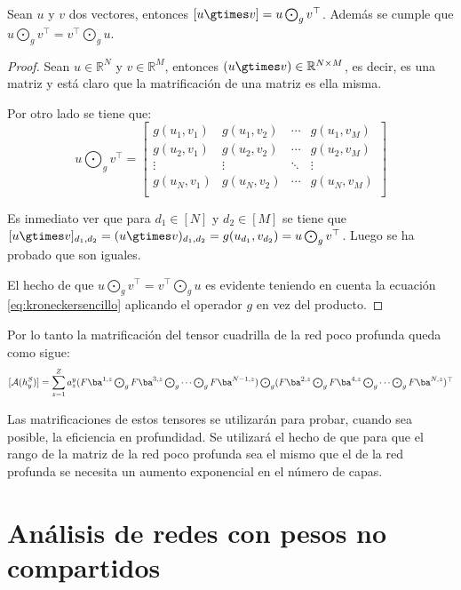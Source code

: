 \begin{prop}
Sean $u$ y $v$ dos vectores, entonces $[u\gtimes v]=u\bigodot_g v^\top$. Además se cumple que $u\bigodot_g v^\top = v^\top\bigodot_g u $.
\end{prop}
\begin{proof}

Sean $u\in\mathbb{R}^N$ y $v\in\mathbb{R}^M$, entonces $(u\gtimes v)\in\mathbb{R}^{N\times M}$, es decir, es una matriz y está claro que la matrificación de una matriz es ella misma.

Por otro lado se tiene que: 
$$
u \bigodot\nolimits_g v^\top = \begin{bmatrix}
g(u_1,v_1) & g(u_1,v_2) &\cdots  & g(u_1,v_M) \\
g(u_2,v_1) & g(u_2,v_2) & \cdots  & g(u_2,v_M) \\
\vdots  & \vdots &\ddots & \vdots\\
g(u_N,v_1) & g(u_N,v_2) & \cdots  & g(u_N,v_M) \\
\end{bmatrix} 
$$

Es inmediato ver que para $d_1\in[N]$ y $d_2\in[M]$ se tiene que $[u\gtimes v]_{d_1,d_2} = (u\gtimes v)_{d_1,d_2} = g(u_{d_1},v_{d_2}) = u\bigodot_g v^\top$. Luego se ha probado que son iguales.

El hecho de que $u\bigodot_g v^\top = v^\top\bigodot_g u$ es evidente teniendo en cuenta la ecuación \eqref{eq:kroneckersencillo} aplicando el operador $g$ en vez del producto.
\end{proof}

Por lo tanto la matrificación del tensor cuadrilla de la red poco profunda queda como sigue:
\begin{equation}
\label{ec:shallowmat}
[\mathcal{A}(h_y^S)]=\sum_{z=1}^{Z}a^y_z(F\ba^{1,z}\textstyle  \bigodot_g F\ba^{3,z} \bigodot_g \cdots  \bigodot_g F\ba^{N-1,z})\bigodot_g(F\ba^{2,z}\textstyle  \bigodot_g F\ba^{4,z} \bigodot_g \cdots  \bigodot_g F\ba^{N,z})^\top
\end{equation}


Las matrificaciones de estos tensores se utilizarán para probar, cuando sea posible, la eficiencia en profundidad. Se utilizará el hecho de que para que el rango de la matriz de la red poco profunda sea el mismo que el de la red profunda se necesita un aumento exponencial en el número de capas.


\section{Análisis de redes con pesos no compartidos}

